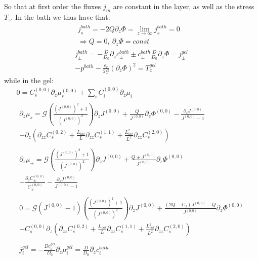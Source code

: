 So that at first order the fluxes $j_m$ are constant in the layer, as well as the stress $T_z$. In the bath we thus have that:
\begin{gather}
\begin{aligned}
j^{bath}_s = - 2Q \partial_z \Phi=\lim\limits_{z\rightarrow \infty} j^{bath}_s=0\\
\Rightarrow Q=0, \ \partial_z \Phi=const 
\end{aligned}\\
j^{bath}_\pm = - \frac{D}{D_0} \partial_z c^{bath}_\pm \pm c^{bath}_\pm\frac{D}{D_0}\partial_z \Phi= j^{gel}_\pm \\
-p^{bath}-\frac{\epsilon_r}{2\mathcal{G}}(\partial_z \Phi)^2=T^{gel}_z\label{sub3}
\end{gather}
while in the gel:
\begin{gather}
0 =C^{(0,0)}_s\partial_z \mu^{(0,0)}_s +\sum_i C^{(0,0)}_i \partial_z \mu_i\\
\begin{aligned}
\partial_z \mu_s = \mathcal{G}\left(\frac{(J^{(0,0)})^2+1}{(J^{(0,0)})^2}\right)\partial_z J^{(0,0)} + \frac{Q}{J^{(0,0)}}\partial_z \Phi^{(0,0)}-\frac{\partial_z J^{(0,0)}}{J^{(0,0)}-1}\\
-\partial_z\left(\partial_{zz} C^{(0,2)}_s + \frac{L_{int}}{L}\partial_{zz} C^{(1,1)}_s+ \frac{L^2_{int}}{L^2}\partial_{zz} C^{(2,0)}_s\right)
\end{aligned}\\
\begin{aligned}
\partial_z \mu_\pm = \mathcal{G}\left(\frac{(J^{(0,0)})^2+1}{(J^{(0,0)})^2}\right)\partial_z J^{(0,0)} + \frac{Q\pm J^{(0,0)}}{J^{(0,0)}}\partial_z \Phi^{(0,0)} \\
+ \frac{\partial_z C_\pm^{(0,0)}}{C_\pm^{(0,0)}}-\frac{\partial_z J^{(0,0)}}{J^{(0,0)}-1}
\end{aligned}\\
\begin{aligned}
0 = \mathcal{G}\left(J^{(0,0)}-1\right)\left(\frac{(J^{(0,0)})^2+1}{(J^{(0,0)})^2}\right)\partial_z J^{(0,0)} +\frac{(2Q-C_f)J^{(0,0)}-Q}{J^{(0,0)}}\partial_z \Phi^{(0,0)} \\
-C_s^{(0,0)}\partial_z\left(\partial_{zz} C^{(0,2)}_s + \frac{L_{int}}{L}\partial_{zz} C^{(1,1)}_s+ \frac{L^2_{int}}{L^2}\partial_{zz} C^{(2,0)}_s\right)
\end{aligned}\\ 
\begin{aligned}
j^{gel}_i= - \frac{Dc^{gel}_i}{D_0}\partial_z \mu^{gel}_i = \frac{D}{D_0}\partial_z c^{bath}_i 
\end{aligned}
\end{gather}
